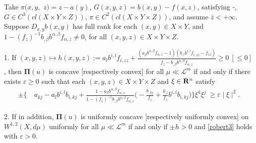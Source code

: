 \begin{example}\label{general example3}
	Take $\pi(x, y,$ $ z) =z-a(y)$,  $G(x,y,z)= b(x,y)-f(x,z)$,  satisfying \Gzero-\Gsix,  $G \in C^3(cl(X\times Y \times Z)
	)$, $\pi \in C^2(cl(X\times Y \times Z)
	)$, and assume $\bar{z}<+\infty$. Suppose $D_{x,y}b(x,y)$ has full rank for each $(x,y) \in X\times Y$, and $1- (f_{z})^{-1}b_{,\beta}b^{\alpha,\beta}f_{\alpha,z} \ne 0$, for all $(x, y,z) \in X\times Y\times Z$.
	
	1. If $(x,y,z)\longmapsto h(x,y,z):=a_{l}b^{i,l}f_{i,zz}+\frac{(a_{\beta}b^{\alpha,\beta}f_{\alpha,z}-1)(b_{,l}b^{i,l}f_{i,zz}-f_{zz})}{f_{z} -b_{,\beta}b^{\alpha,\beta}f_{\alpha,z}} \ge 0 ~[\le 0]$ , then $\pmb \Pi(u)$ is concave  [respectively convex] for all $\mu\ll \mathcal{L}^m$ if and only if there exists $\varepsilon \ge 0$ such that each $(x,y,z) \in X \times Y\times Z$ and $\xi \in {\mathbf R}^{n}$ satisfy 
	\begin{equation}\label{robert3}
	\begin{split}
	\pm \Bigg\{&~a_{kj} -a_{l}b^{i,l}b_{i,kj} +\frac{1-a_{\beta}b^{\alpha,\beta}f_{\alpha,z}}
	{1- (f_{z})^{-1}b_{,\beta}b^{\alpha,\beta}f_{\alpha,z}}
	\Big(-\frac{b_{,kj}}{f_z}+\frac{b_{,l}}{f_z}b^{i,l} b_{i,kj}\Big) \Bigg\}\xi^{k}\xi^{j} \
	\ge  \varepsilon \mid \xi\mid ^2.
	\end{split}
	\end{equation}
	
	2. If in addition, $\pmb \Pi(u)$ is uniformly concave [respectively uniformly convex] on $W^{1,2}(X,d\mu)$ uniformly for all $\mu\ll \mathcal{L}^m$ if and only if $\pm h>0$ and  \eqref{robert3} holds with $\varepsilon>0$.
\end{example}

